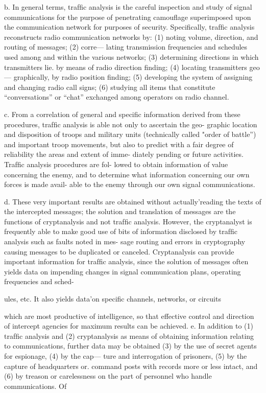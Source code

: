 b. In general terms, trafﬁc analysis is the careful inspection and study
of signal communications for the purpose of penetrating camouﬂage
superimposed upon the communication network for purposes of security.
Speciﬁcally, trafﬁc analysis reconstructs radio communication networks
by: (1) noting volume, direction, and routing of messages; (2) corre—
lating transmission frequencies and schedules used among and within the
various networks; (3) determining directions in which transmitters lie.
by means of radio direction ﬁnding; (4) locating transmitters geo—
graphically, by radio position ﬁnding; (5) developing the system of
assigning and changing radio call signs; (6) studying all items that
constitute “conversations” or “chat” exchanged among operators on
radio channel.

c. From a correlation of general and speciﬁc information derived from
these procedures, trafﬁc analysis is able not only to ascertain the geo-
graphic location and disposition of troops and military units (technically
called "order of battle”) and important troop movements, but also to
predict with a fair degree of reliability the areas and extent of imme-
diately pending or future activities. Trafﬁc analysis procedures are fol-
lowed to obtain information of value concerning the enemy, and to
determine what information concerning our own forces is made avail-
able to the enemy through our own signal communications.

d. These very important results are obtained without actually'reading
the texts of the intercepted messages; the solution and translation of
messages are the functions of cryptanalysis and not trafﬁc analysis.
However, the cryptanalyst is frequently able to make good use of bits
of information disclosed by trafﬁc analysis such as faults noted in mes-
sage routing and errors in cryptography causing messages to be duplicated
or canceled. Cryptanalysis can provide important information for trafﬁc
analysis, since the solution of messages often yields data on impending
changes in signal communication plans, operating frequencies and sched-

ules, etc. It also yields data'on speciﬁc channels, networks, or circuits

which are most productive of intelligence, so that effective control and
direction of intercept agencies for maximum results can be achieved.
e. In addition to (1) trafﬁc analysis and (2) cryptanalysis as means of
obtaining information relating to communications, further data may be
obtained (3) by the use of secret agents for espionage, (4) by the cap—
ture and interrogation of prisoners, (5) by the capture of headquarters
or. command posts with records more or less intact, and (6) by treason
or carelessness on the part of personnel who handle communications. Of

